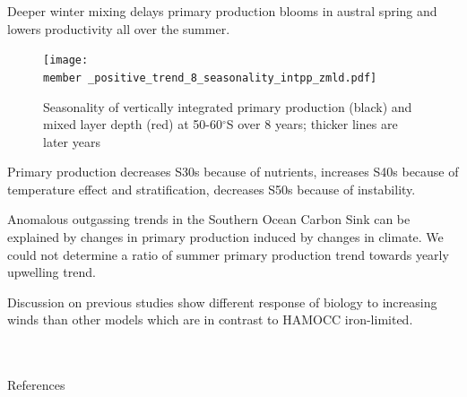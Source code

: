 \documentclass[aspectratio=169]{beamer}
\newcommand{\member}{m182_1988_1995} %
\begin{document}
\begin{frame}{Deeper winter mixing delays primary production blooms in austral spring and lowers productivity all over the summer.}
	\begin{figure}[h]
		\centering
		\texttt{[image: \\member \_positive\_trend\_8\_seasonality\_intpp\_zmld.pdf]} %
		\caption{Seasonality of vertically integrated primary production (black) and mixed layer depth (red) at 50-60$^\circ$S over 8 years; thicker lines are later years}
		\label{fig:zmld_intpp_seasonality}
	\end{figure}
	
\end{frame}

\begin{frame}{Primary production decreases S30s because of nutrients, increases S40s because of temperature effect and stratification, decreases S50s because of instability.}
	
\end{frame}	
	
\begin{frame}{Anomalous outgassing trends in the Southern Ocean Carbon Sink can be explained by changes in primary production induced by changes in climate. We could not determine a ratio of summer primary production trend towards yearly upwelling trend.}
	
\end{frame}

\begin{frame}{Discussion on previous studies show different response of biology to increasing winds than other models which are in contrast to HAMOCC iron-limited.}
\citep{Lovenduski2008} \\
\citep{wang2012} \\
\citep{Hauck2013} \\

\end{frame}
	
	
\appendix

\begin{frame}[allowframebreaks]{References}
\baselineskip12pt



\end{frame}	
	
	
	
\end{document}

